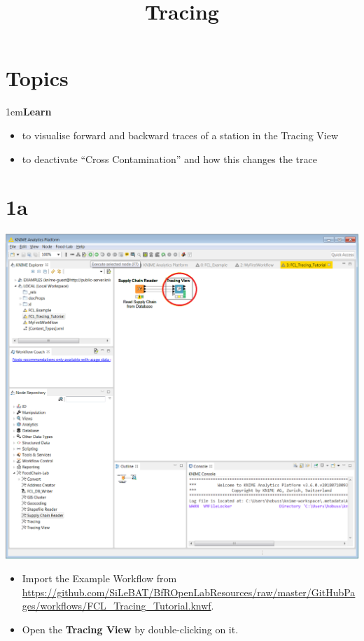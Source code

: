 \documentclass[10pt]{beamer}
\title{Tracing}
\date{}
\begin{document}
\maketitle

\section{Topics}
\begin{frame}
\leftskip1em\textbf{Learn}
	\begin{itemize}
		\item to visualise forward and backward traces of a station in the Tracing View
		\item to deactivate “Cross Contamination” and how this changes the trace
	\end{itemize}
\end{frame}

\section{1a}
\begin{frame}
	\begin{center}
  		\includegraphics[height=0.6\textheight]{1a.png}
	\end{center}
	\begin{itemize}
		\item Import the Example Workflow from \url{https://github.com/SiLeBAT/BfROpenLabResources/raw/master/GitHubPages/workflows/FCL_Tracing_Tutorial.knwf}.
		\item Open the \textbf{Tracing View} by double-clicking on it.
	\end{itemize}
\end{frame}
\end{document}
